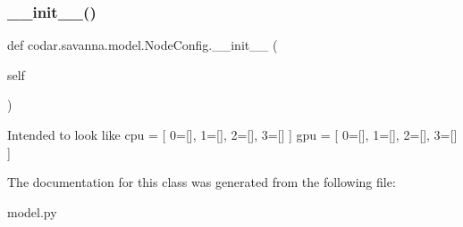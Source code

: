 \subsubsection{\texorpdfstring{\+\_\+\+\_\+init\+\_\+\+\_\+()}{\_\_init\_\_()}}
{\footnotesize\ttfamily def codar.\+savanna.\+model.\+Node\+Config.\+\_\+\+\_\+init\+\_\+\+\_\+ (\begin{DoxyParamCaption}\item[{}]{self }\end{DoxyParamCaption})}

\begin{DoxyVerb}Intended to look like
cpu = [ 0=[], 1=[], 2=[], 3=[] ]
gpu = [ 0=[], 1=[], 2=[], 3=[] ]
\end{DoxyVerb}
 

The documentation for this class was generated from the following file\+:\begin{DoxyCompactItemize}
\item 
model.\+py\end{DoxyCompactItemize}
